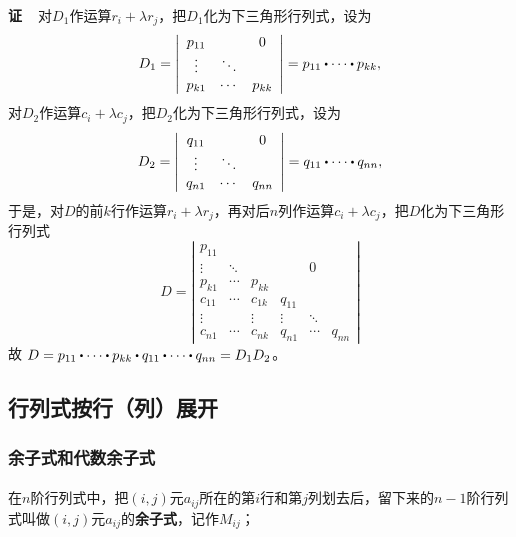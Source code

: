 \paragraph{}
\textbf{证~~}对$D_1$作运算$r_i+\lambda r_j$，把$D_1$化为下三角形行列式，设为
\begin{equation*}
  D_1 = \left|\begin{array}{ccc}
    p_{11} & & 0 \\
    \vdots & \ddots & \\
    p_{k1} & \cdots & p_{kk}
  \end{array} \right| = p_{11} \bigcdot \cdots \bigcdot p_{kk},
\end{equation*}
对$D_2$作运算$c_i + \lambda c_j$，把$D_2$化为下三角形行列式，设为
\begin{equation*}
  D_2 = \left|\begin{array}{ccc}
    q_{11} & & 0 \\
    \vdots & \ddots & \\
    q_{n1} & \cdots & q_{nn}
  \end{array} \right| = q_{11} \bigcdot \cdots \bigcdot q_{nn},
\end{equation*}
于是，对$D$的前$k$行作运算$r_i + \lambda r_j$，再对后$n$列作运算$c_i + \lambda c_j$，把$D$化为下三角形行列式
\begin{equation*}
  D = \left|\begin{array}{cccccc}
    p_{11} & & & & & \\
    \vdots & \ddots & & & 0 & \\
    p_{k1} & \cdots & p_{kk} & & & \\
    c_{11} & \cdots & c_{1k} & q_{11} & & \\
    \vdots & & \vdots & \vdots & \ddots & \\
    c_{n1} & \cdots & c_{nk} & q_{n1} & \cdots & q_{nn}
  \end{array} \right|
\end{equation*}
故 $D = p_{11} \bigcdot \cdots \bigcdot p_{kk} \bigcdot q_{11} \bigcdot \cdots \bigcdot q_{nn} = D_1D_2$。

\subsection{行列式按行（列）展开}
\subsubsection{余子式和代数余子式}
\paragraph{}
在$n$阶行列式中，把$(i,j)$元$a_{ij}$所在的第$i$行和第$j$列划去后，留下来的$n-1$阶行列式叫做$(i,j)$元$a_{ij}$的\textbf{余子式}，记作$M_{ij}$；

